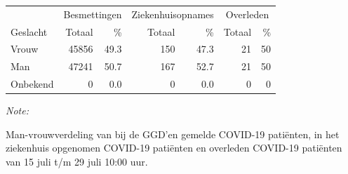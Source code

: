 \documentclass[
  english,
  man,floatsintext]{apa6}
\begin{document}
\begin{table}
\centering\begingroup\fontsize{11}{13}\selectfont

\begin{threeparttable}
\begin{tabular}{lrrrrrr}
\toprule
\multicolumn{1}{c}{ } & \multicolumn{2}{c}{Besmettingen} & \multicolumn{2}{c}{Ziekenhuisopnames} & \multicolumn{2}{c}{Overleden} \\
\cmidrule(l{3pt}r{3pt}){2-3} \cmidrule(l{3pt}r{3pt}){4-5} \cmidrule(l{3pt}r{3pt}){6-7}
Geslacht & Totaal & \% & Totaal & \% & Totaal & \%\\
\midrule
Vrouw & 45856 & 49.3 & 150 & 47.3 & 21 & 50\\
Man & 47241 & 50.7 & 167 & 52.7 & 21 & 50\\
Onbekend & 0 & 0.0 & 0 & 0.0 & 0 & 0\\
\bottomrule
\end{tabular}
\begin{tablenotes}
\item \textit{Note: } 
\item Man-vrouwverdeling van bij de GGD’en gemelde COVID-19 patiënten, in het ziekenhuis opgenomen COVID-19 patiënten en overleden COVID-19 patiënten van 15 juli t/m 29 juli 10:00 uur.
\end{tablenotes}
\end{threeparttable}
\endgroup{}
\end{table}
\newpage
\end{document}
